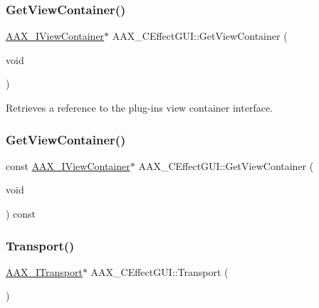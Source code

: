 \mbox{\label{a01477_a49730536ab4c17d85ca6a9ca4a67e6d3}} 
\subsubsection{\texorpdfstring{GetViewContainer()}{GetViewContainer()}\hspace{0.1cm}{\footnotesize\ttfamily [1/2]}}
{\footnotesize\ttfamily \mbox{\hyperlink{a01889}{A\+A\+X\+\_\+\+I\+View\+Container}}$\ast$ A\+A\+X\+\_\+\+C\+Effect\+G\+U\+I\+::\+Get\+View\+Container (\begin{DoxyParamCaption}\item[{void}]{ }\end{DoxyParamCaption})}



Retrieves a reference to the plug-\/in\textquotesingle{}s view container interface. 

\mbox{\label{a01477_a9c203877a02d07182c2e09abb47c5858}} 
\subsubsection{\texorpdfstring{GetViewContainer()}{GetViewContainer()}\hspace{0.1cm}{\footnotesize\ttfamily [2/2]}}
{\footnotesize\ttfamily const \mbox{\hyperlink{a01889}{A\+A\+X\+\_\+\+I\+View\+Container}}$\ast$ A\+A\+X\+\_\+\+C\+Effect\+G\+U\+I\+::\+Get\+View\+Container (\begin{DoxyParamCaption}\item[{void}]{ }\end{DoxyParamCaption}) const}

\mbox{\label{a01477_a5a034e713b03fb4591e45c2e7167189d}} 
\subsubsection{\texorpdfstring{Transport()}{Transport()}\hspace{0.1cm}{\footnotesize\ttfamily [1/2]}}
{\footnotesize\ttfamily \mbox{\hyperlink{a01885}{A\+A\+X\+\_\+\+I\+Transport}}$\ast$ A\+A\+X\+\_\+\+C\+Effect\+G\+U\+I\+::\+Transport (\begin{DoxyParamCaption}{ }\end{DoxyParamCaption})}



